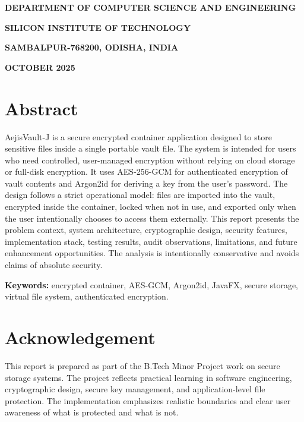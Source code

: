 \documentclass[12pt,a4paper]{report}
\newcommand{\projname}{AejisVault-J}
\begin{document}
\begin{titlepage}
  \vfill
  {\LARGE\bfseries DEPARTMENT OF COMPUTER SCIENCE AND ENGINEERING\par}
  \vspace{0.5em}
  {\LARGE\bfseries SILICON INSTITUTE OF TECHNOLOGY\par}
  \vspace{0.5em}
  {\LARGE\bfseries SAMBALPUR-768200, ODISHA, INDIA\par}
  \vspace{0.5em}
  {\LARGE\bfseries OCTOBER 2025\par}
\end{titlepage}

\chapter*{Abstract}
\projname{} is a secure encrypted container application designed to store sensitive files inside a single portable vault file. The system is intended for users who need controlled, user-managed encryption without relying on cloud storage or full-disk encryption. It uses AES-256-GCM for authenticated encryption of vault contents and Argon2id for deriving a key from the user's password. The design follows a strict operational model: files are imported into the vault, encrypted inside the container, locked when not in use, and exported only when the user intentionally chooses to access them externally. This report presents the problem context, system architecture, cryptographic design, security features, implementation stack, testing results, audit observations, limitations, and future enhancement opportunities. The analysis is intentionally conservative and avoids claims of absolute security.

{\bfseries Keywords:} encrypted container, AES-GCM, Argon2id, JavaFX, secure storage, virtual file system, authenticated encryption.

\chapter*{Acknowledgement}
This report is prepared as part of the B.Tech Minor Project work on secure storage systems. The project reflects practical learning in software engineering, cryptographic design, secure key management, and application-level file protection. The implementation emphasizes realistic boundaries and clear user awareness of what is protected and what is not.
\end{document}

